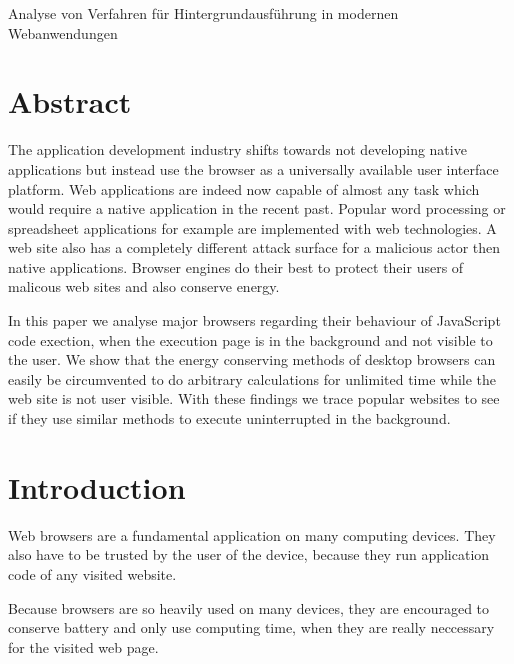 \documentclass[article,type=bsc,colorback,accentcolor=tud9c]{tudthesis}
\begin{document}
    {Analyse von Verfahren für Hintergrundausführung in modernen Webanwendungen}
  \author{Yannick Reifschneider}
  \dateofexam{\today}{\today}
  \makethesistitle

  \tableofcontents

  \newpage
  \section{Abstract}

  The application development industry shifts towards not developing native applications but instead use the browser as a universally available user interface platform. Web applications are indeed now capable of almost any task which would require a native application in the recent past. Popular word processing or spreadsheet applications for example are implemented with web technologies. A web site also has a completely different attack surface for a malicious actor then native applications. Browser engines do their best to protect their users of malicous web sites and also conserve energy.
  
  In this paper we analyse major browsers regarding their behaviour of JavaScript code exection, when the execution page is in the background and not visible to the user. We show that the energy conserving methods of desktop browsers can easily be circumvented to do arbitrary calculations for unlimited time while the web site is not user visible. With these findings we trace popular websites to see if they use similar methods to execute uninterrupted in the background.

  \newpage
  \section{Introduction}

  Web browsers are a fundamental application on many computing devices. They also have to be trusted by the user of the device, because they run application code of any visited website.

  Because browsers are so heavily used on many devices, they are encouraged to conserve battery and only use computing time, when they are really neccessary for the visited web page.
\end{document}
